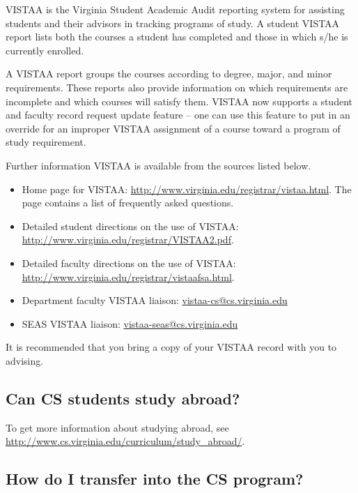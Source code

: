 \documentclass[12pt,twoside]{article}
\newenvironment{itemlist}{
\begin{itemize}
\setlength{\itemsep}{0pt}
\setlength{\parskip}{0pt}}
{\end{itemize}}
\begin{document}
VISTAA is the Virginia Student Academic Audit reporting system for
assisting students and their advisors in tracking programs of study. A
student VISTAA report lists both the courses a student has completed
and those in which s/he is currently enrolled.

A VISTAA report groups the courses according to degree, major, and
minor requirements.  These reports also provide information on which
requirements are incomplete and which courses will satisfy them.
VISTAA now supports a student and faculty record request update
feature -- one can use this feature to put in an override for an
improper VISTAA assignment of a course toward a program of study
requirement.

Further information VISTAA is available from the sources listed below.

\begin{itemlist}
\item Home page for VISTAA:
\url{http://www.virginia.edu/registrar/vistaa.html}. The page contains
a list of frequently asked questions. %
\item Detailed student directions on the use of VISTAA:
\url{http://www.virginia.edu/registrar/VISTAA2.pdf}. %
\item Detailed faculty directions on the use of VISTAA:
\url{http://www.virginia.edu/registrar/vistaafsa.html}. %
\item Department faculty VISTAA liaison: \url{vistaa-cs@cs.virginia.edu} %
\item SEAS VISTAA liaison: \url{vistaa-seas@cs.virginia.edu} %
\end{itemlist}

It is recommended that you bring a copy of your VISTAA record with you
to advising.

\subsection{Can CS students study abroad?}

To get more information about studying abroad, see
\url{http://www.cs.virginia.edu/curriculum/study_abroad/}.

\subsection{How do I transfer into the CS program?}
\end{document}

